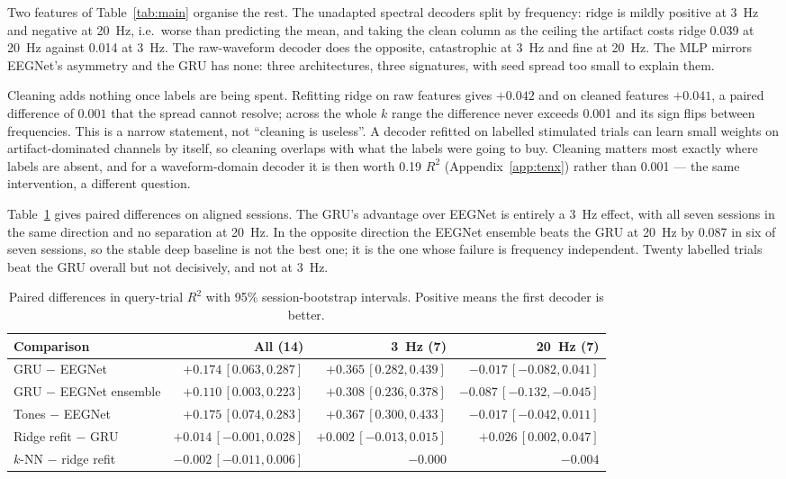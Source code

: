 \documentclass[11pt]{article}
\newcommand{\Rtwo}{R^{2}}
\begin{document}
Two features of Table~\ref{tab:main} organise the rest. The unadapted spectral decoders split
by frequency: ridge is mildly positive at 3~Hz and negative at 20~Hz, i.e.\ worse than
predicting the mean, and taking the clean column as the ceiling the artifact costs ridge 0.039
at 20~Hz against 0.014 at 3~Hz. The raw-waveform decoder does the opposite, catastrophic at
3~Hz and fine at 20~Hz. The MLP mirrors EEGNet's asymmetry and the GRU has none: three
architectures, three signatures, with seed spread too small to explain them.

Cleaning adds nothing once labels are being spent. Refitting ridge on raw features gives
$+0.042$ and on cleaned features $+0.041$, a paired difference of $0.001$ that the spread
cannot resolve; across the whole $k$ range the difference never exceeds 0.001 and its sign
flips between frequencies. This is a narrow statement, not ``cleaning is useless''. A decoder
refitted on labelled stimulated trials can learn small weights on artifact-dominated channels
by itself, so cleaning overlaps with what the labels were going to buy. Cleaning matters most
exactly where labels are absent, and for a waveform-domain decoder it is then worth 0.19
$\Rtwo$ (Appendix~\ref{app:tenx}) rather than 0.001 --- the same intervention, a different
question.

Table~\ref{tab:paired} gives paired differences on aligned sessions. The GRU's advantage over
EEGNet is entirely a 3~Hz effect, with all seven sessions in the same direction and no
separation at 20~Hz. In the opposite direction the EEGNet ensemble beats the GRU at 20~Hz by
0.087 in six of seven sessions, so the stable deep baseline is not the best one; it is the one
whose failure is frequency independent. Twenty labelled trials beat the GRU overall but not
decisively, and not at 3~Hz.

\begin{table}[h]
\centering
\small
\caption{Paired differences in query-trial $\Rtwo$ with 95\% session-bootstrap intervals.
Positive means the first decoder is better.}
\label{tab:paired}
\begin{tabular}{@{}lrrr@{}}
\toprule
Comparison & All (14) & 3~Hz (7) & 20~Hz (7) \\
\midrule
GRU $-$ EEGNet              & $+0.174\,[0.063, 0.287]$ & $+0.365\,[0.282, 0.439]$ & $-0.017\,[-0.082, 0.041]$ \\
GRU $-$ EEGNet ensemble     & $+0.110\,[0.003, 0.223]$ & $+0.308\,[0.236, 0.378]$ & $-0.087\,[-0.132, -0.045]$ \\
Tones $-$ EEGNet            & $+0.175\,[0.074, 0.283]$ & $+0.367\,[0.300, 0.433]$ & $-0.017\,[-0.042, 0.011]$ \\
Ridge refit $-$ GRU         & $+0.014\,[-0.001, 0.028]$ & $+0.002\,[-0.013, 0.015]$ & $+0.026\,[0.002, 0.047]$ \\
$k$-NN $-$ ridge refit      & $-0.002\,[-0.011, 0.006]$ & $-0.000$ & $-0.004$ \\
\bottomrule
\end{tabular}
\end{table}
\end{document}
